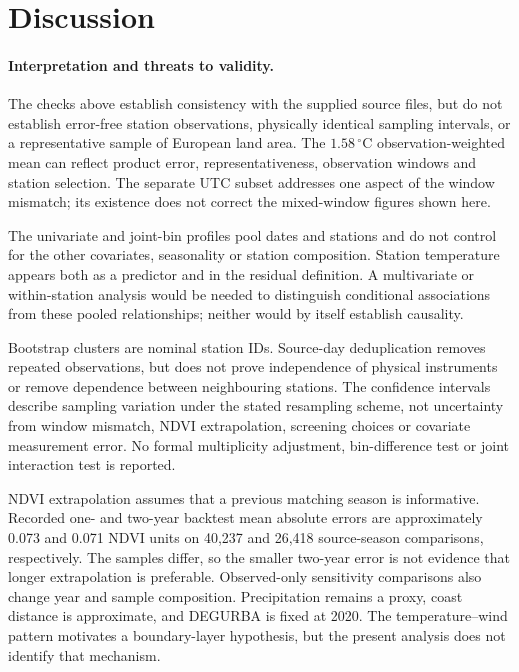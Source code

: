 \documentclass[a4paper,12pt,leqno]{article}
\begin{document}


\section{Discussion}
\label{sec:discussion}

\paragraph{Interpretation and threats to validity.}
The checks above establish consistency with the supplied source files,
but do not establish error-free station observations, physically identical
sampling intervals, or a representative sample of European land area.
The $1.58\,^\circ$C observation-weighted mean can reflect product error,
representativeness, observation windows and station selection. The
separate UTC subset addresses one aspect of the window mismatch; its
existence does not correct the mixed-window figures shown here.

The univariate and joint-bin profiles pool dates and stations and do not
control for the other covariates, seasonality or station composition.
Station temperature appears both as a predictor and in the residual
definition. A multivariate or within-station analysis would be needed
to distinguish conditional associations from these pooled relationships;
neither would by itself establish causality.

Bootstrap clusters are nominal station IDs. Source-day deduplication
removes repeated observations, but does not prove independence of physical
instruments or remove dependence between neighbouring stations. The
confidence intervals describe sampling variation under the stated
resampling scheme, not uncertainty from window mismatch, NDVI extrapolation,
screening choices or covariate measurement error. No formal multiplicity
adjustment, bin-difference test or joint interaction test is reported.

NDVI extrapolation assumes that a previous matching season is informative.
Recorded one- and two-year backtest mean absolute errors are approximately
0.073 and 0.071 NDVI units on 40,237 and 26,418 source-season comparisons,
respectively. The samples differ, so the smaller two-year error is not
evidence that longer extrapolation is preferable. Observed-only sensitivity
comparisons also change year and sample composition. Precipitation remains
a proxy, coast distance is approximate, and DEGURBA is fixed at 2020.
The temperature--wind pattern motivates a boundary-layer hypothesis,
but the present analysis does not identify that mechanism.
\end{document}
